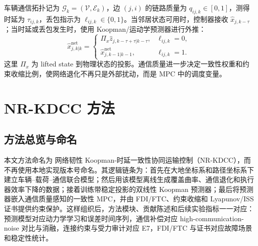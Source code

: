 \documentclass[twocolumn,3p,times,procedia]{elsarticle}
\newcommand{\Method}{NR-KDCC}
\newcommand{\MethodCN}{网络韧性 Koopman-时延一致性协同运输控制}
\begin{document}
车辆通信拓扑记为 $\mathcal G_k=(\mathcal V,\mathcal E_k)$，边 $(j,i)$ 的链路质量为 $q_{ij,k}\in[0,1]$，测得时延为 $\tau_{ij,k}$，丢包指示为 $\ell_{ij,k}\in\{0,1\}$。当邻居状态可用时，控制器接收 $\hat x_{j,k-\tau}$；当时延或丢包发生时，使用 Koopman/运动学预测器进行外推：
\begin{equation}
\hat x_{j,k|k}^{\mathrm{net}}=
\begin{cases}
\Pi_x \hat z_{j,k-\tau+\tau|k-\tau}, & \ell_{ij,k}=0,\\
\hat x_{j,k-1|k-1}^{\mathrm{net}}, & \ell_{ij,k}=1 .
\end{cases}
\label{eq:delay_prediction}
\end{equation}
这里 $\Pi_x$ 为 lifted state 到物理状态的投影。通信质量进一步决定一致性权重和约束收缩比例，使网络退化不再只是外部扰动，而是 MPC 中的调度变量。

\section{\Method{} 方法}

\subsection{方法总览与命名}

本文方法命名为 \MethodCN{}（\Method{}），而不再使用本地实现版本号命名。其逻辑链条为：首先在大地坐标系和路径坐标系下建立车辆--载荷--通信联合模型；然后用该模型离线生成覆盖曲率、通信退化和执行器效率下降的数据；接着训练带稳定投影的双线性 Koopman 预测器；最后将预测器嵌入通信质量感知的一致性 MPC，并由 FDI/FTC、约束收缩和 Lyapunov/ISS 证书提供约束保护。这样组织后，方法模块、贡献陈述和后续实验指标一一对应：预测模型对应动力学学习和误差时间序列，通信补偿对应 high-communication-noise 对比与消融，连接约束与受力审计对应 E7，FDI/FTC 与证书对应故障场景和稳定性统计。
\end{document}
